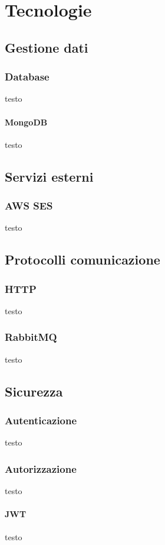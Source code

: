 \chapter{Tecnologie}



\section{Gestione dati}
\subsection{Database}
testo
\subsubsection{MongoDB}
testo

\section{Servizi esterni}
\subsection{AWS SES}
testo
\section{Protocolli comunicazione}
\subsection{HTTP}
testo
\subsection{RabbitMQ}
testo

\section{Sicurezza}
\subsection{Autenticazione}
testo
\subsection{Autorizzazione}
testo
\subsubsection{JWT}
testo
